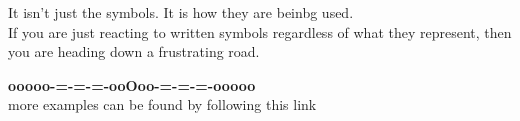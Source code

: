 \documentclass{ximera}
\begin{document}
It isn't just the symbols.  It is how they are beinbg used. \\


If you are just reacting to written symbols regardless of what they represent, then you are heading down a frustrating road.





\begin{center}
\textbf{\textcolor{green!50!black}{ooooo-=-=-=-ooOoo-=-=-=-ooooo}} \\

more examples can be found by following this link\\ 

\end{center}
\end{document}
